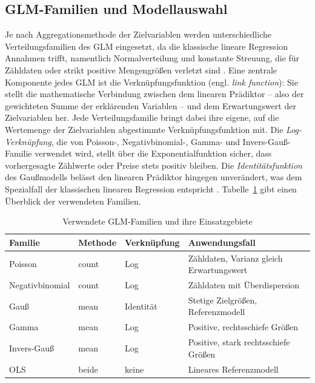 \subsection{GLM-Familien und Modellauswahl}

Je nach Aggregationsmethode der Zielvariablen werden unterschiedliche Verteilungsfamilien des GLM eingesetzt, da die klassische lineare Regression Annahmen trifft, namentlich Normalverteilung und konstante Streuung, die für Zähldaten oder strikt positive Mengengrößen verletzt sind \parencite[vgl.][S.~1~ff.]{McCullagh.1989}. Eine zentrale Komponente jedes GLM ist die Verknüpfungsfunktion (engl. \emph{link function}): Sie stellt die mathematische Verbindung zwischen dem linearen Prädiktor -- also der gewichteten Summe der erklärenden Variablen -- und dem Erwartungswert der Zielvariablen her. Jede Verteilungsfamilie bringt dabei ihre eigene, auf die Wertemenge der Zielvariablen abgestimmte Verknüpfungsfunktion mit. Die \emph{Log-Verknüpfung}, die von Poisson-, Negativbinomial-, Gamma- und Invers-Gauß-Familie verwendet wird, stellt über die Exponentialfunktion sicher, dass vorhergesagte Zählwerte oder Preise stets positiv bleiben. Die \emph{Identitätsfunktion} des Gaußmodells belässt den linearen Prädiktor hingegen unverändert, was dem Spezialfall der klassischen linearen Regression entspricht \parencite[vgl.][S.~31~ff.]{McCullagh.1989}. Tabelle~\ref{tab:glm_familien} gibt einen Überblick der verwendeten Familien.

\begin{table}[htb]
\centering
\caption[Verwendete GLM-Familien]{Verwendete GLM-Familien und ihre Einsatzgebiete\footnotemark}
\label{tab:glm_familien}
\small
\begin{tabular}{p{3.2cm}p{1.5cm}p{2cm}p{5.5cm}}
\toprule
\textbf{Familie} & \textbf{Methode} & \textbf{Verknüpfung} & \textbf{Anwendungsfall} \\
\midrule
Poisson           & count & Log       & Zähldaten, Varianz gleich Erwartungswert \\
Negativbinomial   & count & Log       & Zähldaten mit Überdispersion \\
Gauß              & mean  & Identität & Stetige Zielgrößen, Referenzmodell \\
Gamma             & mean  & Log       & Positive, rechtsschiefe Größen \\
Invers-Gauß       & mean  & Log       & Positive, stark rechtsschiefe Größen \\
OLS               & beide & keine     & Lineares Referenzmodell \\
\bottomrule
\end{tabular}
\end{table}

